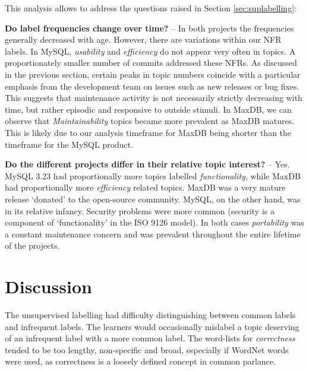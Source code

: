 \documentclass[]{sig-alternate}
\begin{document}
This analysis allows to address the questions raised in Section \ref{sec:suplabelling}:

\textbf{Do label frequencies change over time?} -- In both projects the frequencies generally decreased with age. 
However, there are variations within our NFR labels. In MySQL, \emph{usability} and \emph{efficiency} do not appear very often in topics. 
A proportionately smaller number of commits addressed these NFRs.
As discussed in the previous section, certain peaks in topic numbers coincide with a particular emphasis from the development team on issues such as new releases or bug fixes.
This suggests that maintenance activity is not necessarily strictly decreasing with time, but rather episodic and responsive to outside stimuli. 
In MaxDB, we can observe that \emph{Maintainability} topics became more prevalent as MaxDB matures. 
This is likely due to our analysis timeframe for MaxDB being shorter than the timeframe for the MySQL product. 



\textbf{Do the different projects differ in their relative topic interest?} -- 
Yes. MySQL 3.23 had proportionally more
topics labelled \emph{functionality}, while MaxDB had proportionally more
\emph{efficiency} related topics. MaxDB was a very mature release `donated' to the open-source community. 
MySQL, on the other hand, was in its relative infancy. 
Security problems were more common (security is a component of `functionality' in the ISO 9126 model). 
In both cases \emph{portability} was a constant maintenance concern and was prevalent throughout the entire lifetime of the projects. 


\section{Discussion}
\label{sec:limit}


The unsupervised labelling had difficulty distinguishing between common labels and infrequent labels. 
The learners would occasionally mislabel a topic deserving of an infrequent label with a more common label.
The word-lists for \emph{correctness} tended to be too lengthy, non-specific and broad, especially if WordNet words were used, as correctness is a loosely defined concept in common parlance.
\end{document}
